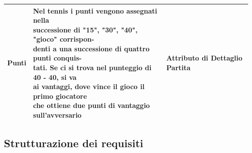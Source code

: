 \documentclass[10pt]{article}
\makeatletter
\newcommand{\splitcell}[2][l]{%
  \begin{tabular}[l]{@{}l@{}}\strut#2\strut\end{tabular}%
}
\makeatother
\begin{document}
\begin{xtabular}[H]{|p{2.3cm}|p{7.5cm}|p{4.35cm}|}
    \hline
    Punti & \splitcell{Nel tennis i punti vengono assegnati nella\\ successione di "15", "30", "40", "gioco" corrispon-\\denti a una successione di quattro punti conquis-\\tati. Se ci si trova nel punteggio di 40 - 40, si va \\ai vantaggi, dove vince il gioco il primo giocatore \\che ottiene due punti di vantaggio sull'avversario} & Attributo di Dettaglio Partita \\
    \hline
\end{xtabular}

\subsection{Strutturazione dei requisiti}
\end{document}

